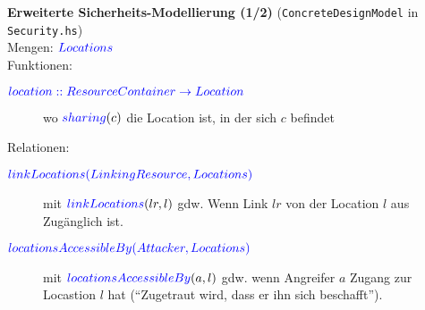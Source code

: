 \documentclass[varwidth=13cm]{standalone}
\begin{document}
\textbf{Erweiterte Sicherheits-Modellierung (1/2)} (\texttt{ConcreteDesignModel} in \texttt{Security.hs})\\

Mengen: ${\color{blue}{Locations}}$  \\


Funktionen:
\begin{description}
  \item[${\color{blue}{location :: ResourceContainer \rightarrow Location}}$]
        wo ${\color{blue}{sharing}}(c)$ die Location ist, in der sich $c$ befindet
\end{description}


Relationen:
\begin{description}
  \item[${\color{blue}{linkLocations(LinkingResource, Locations)}}$]
        mit ${\color{blue}{linkLocations}}(lr, l)$ gdw. Wenn Link $lr$
        von der Location $l$ aus Zugänglich ist.

  \item[${\color{blue}{locationsAccessibleBy(Attacker, Locations)}}$]
        mit ${\color{blue}{locationsAccessibleBy}}(a, l)$ gdw. wenn Angreifer $a$
        Zugang zur Locastion $l$ hat (\enquote{Zugetraut wird, dass er ihn sich beschafft}).
\end{description}
\end{document}

